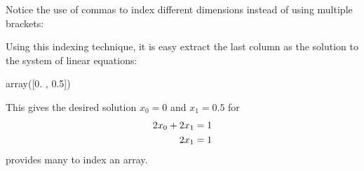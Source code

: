 \documentclass[letterpaper,10pt,english]{sphinxmanual}
\begin{document}
Notice the use of commas to index different dimensions instead of using multiple brackets:

\begin{sphinxVerbatim}[commandchars=\\\{\}]
 \PYG{p}{[}\PYG{p}{]}\PYG{p}{[}\PYG{p}{]}  \PYG{p}{[}\PYG{p}{]}
\end{sphinxVerbatim}

Using this indexing technique, it is easy extract the last column as the solution to the system of linear equations:

\begin{sphinxVerbatim}[commandchars=\\\{\}]
  \PYG{p}{[}\PYG{p}{]}
\end{sphinxVerbatim}

\begin{sphinxVerbatim}[commandchars=\\\{\}]
array([0. , 0.5])
\end{sphinxVerbatim}

This gives the desired solution \(x_0=0\) and \(x_1=0.5\) for
\begin{equation*}
\begin{split} \begin{aligned}
2x_0 + 2x_1 &= 1\\
\hphantom{2x_0 +}  2x_1 &= 1\\
\end{aligned}\end{split}
\end{equation*}
 provides many  to index an array.

\begin{sphinxVerbatim}[commandchars=\\\{\}]
  
 \PYG{p}{[}\PYG{p}{]}  
\end{sphinxVerbatim}
\end{document}
